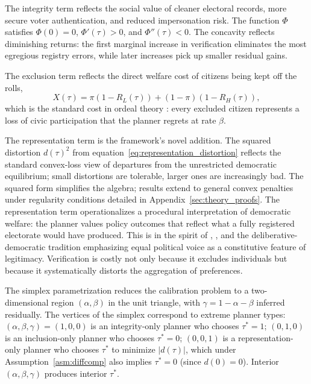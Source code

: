 The integrity term reflects the social value of cleaner electoral records, more secure voter authentication, and reduced impersonation risk. The function $\Phi$ satisfies $\Phi(0) = 0$, $\Phi'(\tau) > 0$, and $\Phi''(\tau) < 0$. The concavity reflects diminishing returns: the first marginal increase in verification eliminates the most egregious registry errors, while later increases pick up smaller residual gains.

The exclusion term reflects the direct welfare cost of citizens being kept off the rolls,
\[
X(\tau) = \pi(1 - R_L(\tau)) + (1-\pi)(1-R_H(\tau)),
\]
which is the standard cost in ordeal theory \citep{Nichols1982TargetinTransferThrough, Alatas2016NetworkStructurAnd}: every excluded citizen represents a loss of civic participation that the planner regrets at rate $\beta$.

The representation term is the framework's novel addition. The squared distortion $d(\tau)^2$ from equation~\eqref{eq:representation_distortion} reflects the standard convex-loss view of departures from the unrestricted democratic equilibrium; small distortions are tolerable, larger ones are increasingly bad. The squared form simplifies the algebra; results extend to general convex penalties under regularity conditions detailed in Appendix~\ref{sec:theory_proofs}. The representation term operationalizes a procedural interpretation of democratic welfare: the planner values policy outcomes that reflect what a fully registered electorate would have produced. This is in the spirit of \citet{Kolm1977MultidimEgalitar}, \citet{Sen1985GoalsCommitmeAnd}, and the deliberative-democratic tradition emphasizing equal political voice as a constitutive feature of legitimacy. Verification is costly not only because it excludes individuals but because it systematically distorts the aggregation of preferences.

The simplex parametrization reduces the calibration problem to a two-dimensional region $(\alpha, \beta)$ in the unit triangle, with $\gamma = 1 - \alpha - \beta$ inferred residually. The vertices of the simplex correspond to extreme planner types: $(\alpha,\beta,\gamma) = (1,0,0)$ is an integrity-only planner who chooses $\tau^* = 1$; $(0,1,0)$ is an inclusion-only planner who chooses $\tau^* = 0$; $(0,0,1)$ is a representation-only planner who chooses $\tau^*$ to minimize $|d(\tau)|$, which under Assumption~\ref{asm:diffcomp} also implies $\tau^* = 0$ (since $d(0) = 0$). Interior $(\alpha,\beta,\gamma)$ produces interior $\tau^*$.

